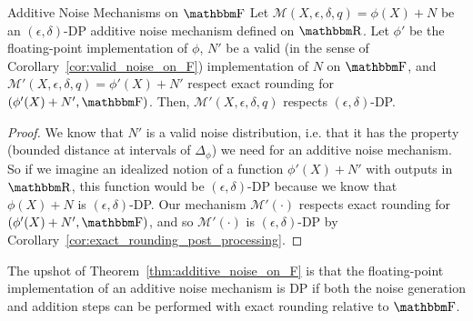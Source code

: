 \documentclass[11pt]{scrartcl} %
\begin{document}
\begin{theorem}
	\label{thm:additive_noise_on_F}
	Additive Noise Mechanisms on $\F$ \newline
	Let $\mathcal{M}(X, \epsilon, \delta, q) = \phi(X) + N$ be an $(\epsilon, \delta)$-DP additive noise mechanism
	defined on $\R$.
	Let $\phi'$ be the floating-point implementation of $\phi$,
	$N'$ be a valid (in the sense of Corollary~\ref{cor:valid_noise_on_F})
	implementation of $N$ on $\F$, and $\mathcal{M'}(X, \epsilon, \delta, q) = \phi'(X) + N'$
	respect exact rounding for $(\phi'(X)+N', \F)$.
	Then, $\mathcal{M'}(X, \epsilon, \delta, q)$ respects $(\epsilon, \delta)$-DP.

	\begin{proof}
		We know that $N'$ is a valid noise distribution, i.e. that it has the property (bounded distance at
		intervals of $\Delta_{\phi}$) we need for an additive noise mechanism.
		So if we imagine an idealized notion of a function $\phi'(X) + N'$ with outputs in $\R$,
		this function would be $(\epsilon, \delta)$-DP because we know that $\phi(X) + N$ is $(\epsilon, \delta)$-DP.
		Our mechanism $\mathcal{M'}(\cdot)$ respects exact rounding for $(\phi'(X) + N', \F)$, and so
		$\mathcal{M'}(\cdot)$ is $(\epsilon,\delta)$-DP by Corollary~\ref{cor:exact_rounding_post_processing}.
	\end{proof}
\end{theorem}
The upshot of Theorem~\ref{thm:additive_noise_on_F} is that the floating-point implementation of
an additive noise mechanism is DP if both the noise generation and addition steps can be performed
with exact rounding relative to $\F$.




\end{document}
